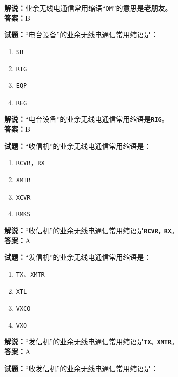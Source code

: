 \documentclass{ctexbook}
\begin{document}
\noindent\textbf{解说：}业余无线电通信常用缩语“\texttt{OM}”的意思是\textbf{老朋友}。\\\noindent\textbf{答案：}B


\bigskip


\noindent\textbf{试题：}“电台设备”的业余无线电通信常用缩语是：

\begin{enumerate}[leftmargin=3em]
	\item \texttt{SB}
	\item \texttt{RIG}
	\item \texttt{EQP}
	\item \texttt{REG}
\end{enumerate}

\noindent\textbf{解说：}“电台设备”的业余无线电通信常用缩语是\texttt{\textbf{RIG}}。\\\noindent\textbf{答案：}B


\bigskip


\noindent\textbf{试题：}“收信机”的业余无线电通信常用缩语是：

\begin{enumerate}[leftmargin=3em]
	\item \texttt{RCVR}，\texttt{RX}
	\item \texttt{XMTR}
	\item \texttt{XCVR}
	\item \texttt{RMKS}
\end{enumerate}

\noindent\textbf{解说：}“收信机”的业余无线电通信常用缩语是\texttt{\textbf{RCVR，RX}}。\\\noindent\textbf{答案：}A


\bigskip


\noindent\textbf{试题：}“发信机”的业余无线电通信常用缩语是：

\begin{enumerate}[leftmargin=3em]
	\item \texttt{TX}、\texttt{XMTR}
	\item \texttt{XTL}
	\item \texttt{VXCO}
	\item \texttt{VXO}
\end{enumerate}

\noindent\textbf{解说：}“发信机”的业余无线电通信常用缩语是\texttt{\textbf{TX、XMTR}}。\\\noindent\textbf{答案：}A


\bigskip


\noindent\textbf{试题：}“收发信机”的业余无线电通信常用缩语是：
\end{document}
